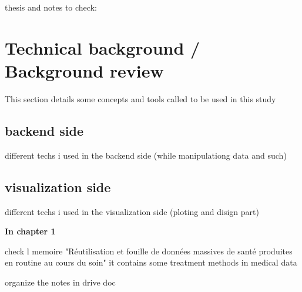 
\newpage
thesis and notes to check:
\chapter{Technical background / Background review}
This section details some concepts and tools called to be used in this study
\section{backend side}
different techs i used in the backend side (while manipulationg data and such)
\section{visualization side}
different techs i used in the visualization side (ploting and disign part)


\textbf{In chapter 1}

check l memoire "Réutilisation et fouille de données massives de santé produites en routine au cours du soin" it contains some treatment methods in medical data 

\bigbreak
organize the notes in drive doc
\bigbreak
